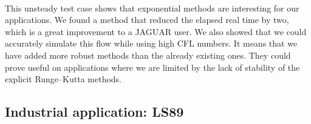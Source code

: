       \paragraph{}
      This unsteady test case shows that exponential methods are interesting for our applications.
      We found a method that reduced the elapsed real time by two, which is a great improvement to a JAGUAR user.
      We also showed that we could accurately simulate this flow while using high CFL numbers.
      It means that we have added more robust methods than the already existing ones.
      They could prove useful on applications where we are limited by the lack of stability of the explicit Runge--Kutta methods.


    \subsection{Industrial application: LS89}
